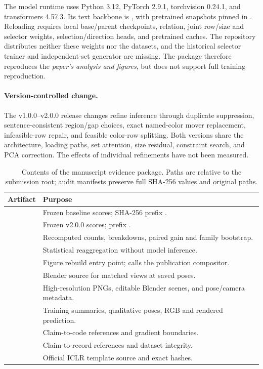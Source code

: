 The model runtime uses Python 3.12, PyTorch 2.9.1, torchvision 0.24.1, and transformers 4.57.3. Its text backbone is , with pretrained snapshots pinned in . Reloading requires local base/parent checkpoints, relation, joint row/size and selector weights, selection/direction heads, and pretrained caches. The repository distributes neither these weights nor the datasets, and the historical selector trainer and independent-set generator are missing. The package therefore reproduces the \emph{paper's analysis and figures}, but does not support full training reproduction.

\paragraph{Version-controlled change.}
The v1.0.0--v2.0.0 release changes refine inference through duplicate suppression, sentence-consistent region/gap choices, exact named-color mover replacement, infeasible-row repair, and feasible color-row splitting. Both versions share the architecture, loading paths, set attention, size residual, constraint search, and PCA correction. The effects of individual refinements have not been measured.

\begin{table}[H]
\centering\small
\caption{Contents of the manuscript evidence package. Paths are relative to the submission root; audit manifests preserve full SHA-256 values and original paths.}
\label{tab:package}
\begin{tabularx}{\linewidth}{@{}lY@{}}\toprule
\textbf{Artifact} & \textbf{Purpose} \\\midrule
{} & Frozen baseline scores; SHA-256 prefix . \\
 & Frozen v2.0.0 scores; prefix . \\
 & Recomputed counts, breakdowns, paired gain and family bootstrap. \\
 & Statistical reaggregation without model inference. \\
 & Figure rebuild entry point; calls the publication compositor. \\
 & Blender source for matched views at saved poses. \\
 & High-resolution PNGs, editable Blender scenes, and pose/camera metadata. \\
 & Training summaries, qualitative poses, RGB and rendered prediction. \\
 & Claim-to-code references and gradient boundaries. \\
 & Claim-to-record references and dataset integrity. \\
 & Official ICLR template source and exact hashes. \\\bottomrule
\end{tabularx}
\end{table}

